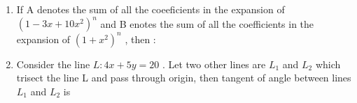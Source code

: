 \documentclass[journal,12pt,onecolumn]{IEEEtran}
\theoremstyle{remark}
\begin{document}
\begin{enumerate}
\item If A denotes the sum of all the coeeficients in the expansion of $(1-3x+10x^2)^{n}$ and B enotes the sum of all the coefficients in the expansion of $(1+x^2)^{n}$ , then :

\hfill{}
\begin{enumerate}   
\end{enumerate}


\item Consider the line $L:4x+5y=20$ . Let two other lines are $L_1$ and $L_2$ which trisect the line L and pass through origin, then tangent of angle between lines $L_1$ and $L_2$ is

\hfill{}
\begin{enumerate}
\end{enumerate}



\end{enumerate}
\end{document}
